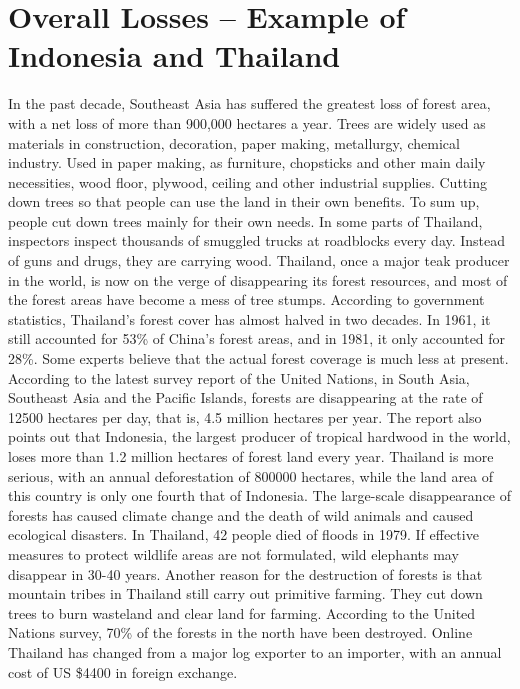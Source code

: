 \documentclass{book}\usepackage{knitr}
\begin{document}
{\section{Overall Losses – Example of Indonesia and Thailand}
In the past decade, Southeast Asia has suffered the greatest loss of forest area, with a net loss of more than 900,000 hectares a year. Trees are widely used as materials in construction, decoration, paper making, metallurgy, chemical industry. Used in paper making, as furniture, chopsticks and other main daily necessities, wood floor, plywood, ceiling and other industrial supplies. Cutting down trees so that people can use the land in their own benefits. To sum up, people cut down trees mainly for their own needs.
	In some parts of Thailand, inspectors inspect thousands of smuggled trucks at roadblocks every day. Instead of guns and drugs, they are carrying wood. Thailand, once a major teak producer in the world, is now on the verge of disappearing its forest resources, and most of the forest areas have become a mess of tree stumps. According to government statistics, Thailand's forest cover has almost halved in two decades. In 1961, it still accounted for 53\% of China's forest areas, and in 1981, it only accounted for 28\%. Some experts believe that the actual forest coverage is much less at present. According to the latest survey report of the United Nations, in South Asia, Southeast Asia and the Pacific Islands, forests are disappearing at the rate of 12500 hectares per day, that is, 4.5 million hectares per year. The report also points out that Indonesia, the largest producer of tropical hardwood in the world, loses more than 1.2 million hectares of forest land every year. Thailand is more serious, with an annual deforestation of 800000 hectares, while the land area of this country is only one fourth that of Indonesia. The large-scale disappearance of forests has caused climate change and the death of wild animals and caused ecological disasters. In Thailand, 42 people died of floods in 1979. If effective measures to protect wildlife areas are not formulated, wild elephants may disappear in 30-40 years. Another reason for the destruction of forests is that mountain tribes in Thailand still carry out primitive farming. They cut down trees to burn wasteland and clear land for farming. According to the United Nations survey, 70\% of the forests in the north have been destroyed. Online Thailand has changed from a major log exporter to an importer, with an annual cost of US \$4400 in foreign exchange.
}
\end{document}
